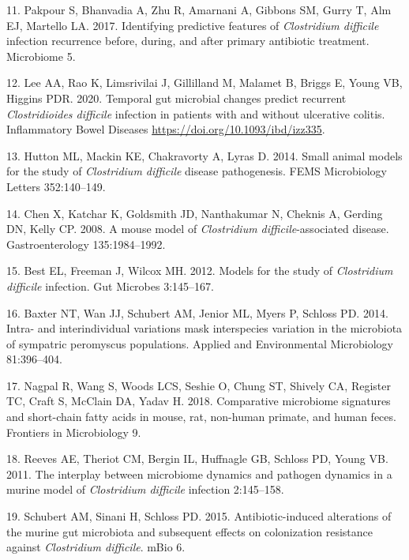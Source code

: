 \documentclass[
  11pt,
]{article}
\begin{document}
\leavevmode\hypertarget{ref-Pakpour2017}{}%
11. Pakpour S, Bhanvadia A, Zhu R, Amarnani A, Gibbons SM, Gurry T, Alm
EJ, Martello LA. 2017. Identifying predictive features of
\emph{Clostridium difficile} infection recurrence before, during, and
after primary antibiotic treatment. Microbiome 5.

\leavevmode\hypertarget{ref-Lee2020}{}%
12. Lee AA, Rao K, Limsrivilai J, Gillilland M, Malamet B, Briggs E,
Young VB, Higgins PDR. 2020. Temporal gut microbial changes predict
recurrent \emph{Clostridioides difficile} infection in patients with and
without ulcerative colitis. Inflammatory Bowel Diseases
\url{https://doi.org/10.1093/ibd/izz335}.

\leavevmode\hypertarget{ref-Hutton2014}{}%
13. Hutton ML, Mackin KE, Chakravorty A, Lyras D. 2014. Small animal
models for the study of \emph{Clostridium difficile} disease
pathogenesis. FEMS Microbiology Letters 352:140--149.

\leavevmode\hypertarget{ref-Chen2008}{}%
14. Chen X, Katchar K, Goldsmith JD, Nanthakumar N, Cheknis A, Gerding
DN, Kelly CP. 2008. A mouse model of \emph{Clostridium
difficile}-associated disease. Gastroenterology 135:1984--1992.

\leavevmode\hypertarget{ref-Best2012}{}%
15. Best EL, Freeman J, Wilcox MH. 2012. Models for the study of
\emph{Clostridium difficile} infection. Gut Microbes 3:145--167.

\leavevmode\hypertarget{ref-Baxter2014}{}%
16. Baxter NT, Wan JJ, Schubert AM, Jenior ML, Myers P, Schloss PD.
2014. Intra- and interindividual variations mask interspecies variation
in the microbiota of sympatric peromyscus populations. Applied and
Environmental Microbiology 81:396--404.

\leavevmode\hypertarget{ref-Nagpal2018}{}%
17. Nagpal R, Wang S, Woods LCS, Seshie O, Chung ST, Shively CA,
Register TC, Craft S, McClain DA, Yadav H. 2018. Comparative microbiome
signatures and short-chain fatty acids in mouse, rat, non-human primate,
and human feces. Frontiers in Microbiology 9.

\leavevmode\hypertarget{ref-Reeves2011}{}%
18. Reeves AE, Theriot CM, Bergin IL, Huffnagle GB, Schloss PD, Young
VB. 2011. The interplay between microbiome dynamics and pathogen
dynamics in a murine model of \emph{Clostridium difficile} infection
2:145--158.

\leavevmode\hypertarget{ref-Schubert2015}{}%
19. Schubert AM, Sinani H, Schloss PD. 2015. Antibiotic-induced
alterations of the murine gut microbiota and subsequent effects on
colonization resistance against \emph{Clostridium difficile}. mBio 6.
\end{document}

